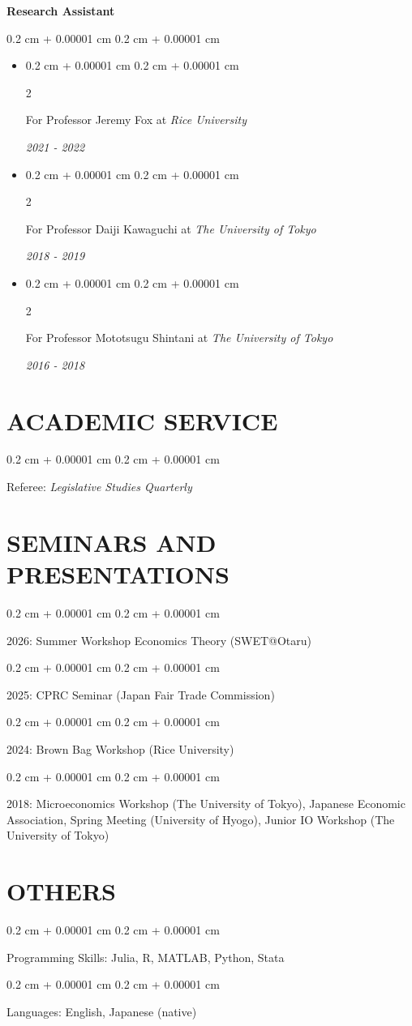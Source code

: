 \documentclass[10pt, letterpaper]{article}
\newenvironment{highlights}{
    \begin{itemize}[
        topsep=0.10 cm,
        parsep=0.10 cm,
        partopsep=0pt,
        itemsep=0.0 cm,
        leftmargin=0.4 cm + 10pt
    ]
}{
    \end{itemize}
} %
\newenvironment{onecolentry}{
    \begin{adjustwidth}{
        0.2 cm + 0.00001 cm
    }{
        0.2 cm + 0.00001 cm
    }
}{
    \end{adjustwidth}
} %
\newenvironment{twocolentry}[2][]{
    \onecolentry
    \def\secondColumn{#2}
    \setcolumnwidth{\fill, 4.5 cm}
    \begin{paracol}{2}
}{
    \switchcolumn \raggedleft \secondColumn
    \end{paracol}
    \endonecolentry
} %
\begin{document}
    \textbf{Research Assistant}
    \vspace{0.10 cm}
    \begin{onecolentry}
        \begin{highlights}
            \item \begin{twocolentry}{
                \textit{2021 - 2022}}
                For Professor Jeremy Fox at \textit{Rice University}
            \end{twocolentry}
            \item \begin{twocolentry}{
                \textit{2018 - 2019}}
                For Professor Daiji Kawaguchi at \textit{The University of Tokyo}
            \end{twocolentry}
            \item \begin{twocolentry}{
                \textit{2016 - 2018}}
                For Professor Mototsugu Shintani at \textit{The University of Tokyo}
            \end{twocolentry}
        \end{highlights}
    \end{onecolentry}

    \section{ACADEMIC SERVICE}
    \begin{onecolentry}
        Referee: \textit{Legislative Studies Quarterly}
    \end{onecolentry}

    \section{SEMINARS AND PRESENTATIONS}
    \begin{onecolentry}
        2026: Summer Workshop Economics Theory (SWET@Otaru)
    \end{onecolentry}
    \begin{onecolentry}
        2025: CPRC Seminar (Japan Fair Trade Commission)
    \end{onecolentry}
    \begin{onecolentry}
        2024: Brown Bag Workshop (Rice University)
    \end{onecolentry}
    \begin{onecolentry}
        2018: Microeconomics Workshop (The University of Tokyo), Japanese Economic Association, Spring Meeting (University of Hyogo), Junior IO Workshop (The University of Tokyo)
    \end{onecolentry}

    \section{OTHERS}
    \begin{onecolentry}
        Programming Skills: Julia, R, MATLAB, Python, Stata
    \end{onecolentry}
    \begin{onecolentry}
        Languages: English, Japanese (native)
    \end{onecolentry}
\end{document}
